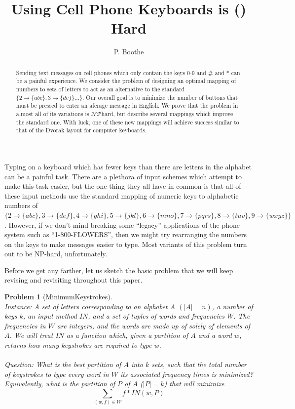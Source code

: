 \documentclass{article}
\title{Using Cell Phone Keyboards is (\NP) Hard}
\author{P. Boothe}
\newtheorem{problem}{Problem}
\newcommand{\NP}{\ensuremath{\mathcal{NP}}}
\begin{document}
\maketitle

\begin{abstract}
Sending text messages on cell phones which only contain the keys 0-9 and \# and
* can be a painful experience.  We consider the problem of designing an optimal
mapping of numbers to sets of letters to act as an alternative to the standard
$\{2\to\{abc\}, 3\to\{def\}\ldots\}$.  Our overall goal is to minimize the
number of buttons that must be pressed to enter an aferage message in English.
We prove that the problem in almost all of its variations is \NP hard, but
describe several mappings which improve the standard one.  With luck, one of
these new mappings will achieve success similar to that of the Dvorak layout
for computer keyboards.
\end{abstract}

Typing on a keyboard which has fewer keys than there are letters in the
alphabet can be a painful task.  There are a plethora of input schemes which
attempt to make this task easier, but the one thing they all have in common is
that all of these input methods use the standard mapping of numeric keys to
alphabetic numbers of 
$\{2\to\{abc\},
         3\to\{def\}, 4\to\{ghi\}, 5\to\{jkl\}, 6\to\{mno\}, 7\to\{pqrs\},
         8\to\{tuv\}, 9\to\{wxyz\}\}$.
However, if we don't mind breaking some ``legacy'' applications of the phone
system such as ``1-800-FLOWERS'', then we might try rearranging the numbers on
the keys to make messages easier to type.  Most variants of this problem turn
out to be NP-hard, unfortunately.

Before we get any farther, let us sketch the basic problem that we will keep
revising and revisiting throughout this paper.
\begin{problem}[{\sc MinimumKeystrokes}]~\\
{\sc Instance}: A set of letters corresponding to an alphabet $A$ $(|A| =
n)$, a number of keys $k$, an input method $IN$, and a set of
tuples of words and frequencies $W$.  The frequencies in $W$ are integers,
and the words are made up of solely of elements of $A$.  We will
treat $IN$ as a function which, given a partition of $A$ and a word
$w$, returns how many keystrokes are required to type $w$.~\\
        ~\\
{\sc Question}: What is the best partition of $A$ into $k$ sets, such that the
total number of keystrokes to type every word in $W$ its associated frequency
times is minimized?  Equivalently, what is the partition of $P$ of $A$ ($|P| = k$) that
will minimize
$$\sum_{(w,f)\in W} f*IN(w,P)$$
\label{probtemplate}
\end{problem}
\end{document}
